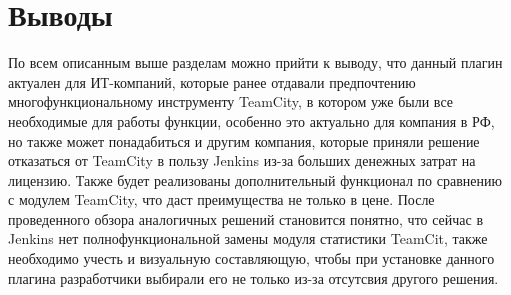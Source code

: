 \section{Выводы} \label{ch1:sec7}

По всем описанным выше разделам можно прийти к выводу, что данный плагин актуален для ИТ-компаний, которые ранее отдавали предпочтению многофункциональному инструменту TeamCity, в котором уже были все необходимые для работы функции, особенно это актуально для компания в РФ, но также может понадабиться и другим компания, которые приняли решение отказаться от TeamCity в пользу Jenkins из-за больших денежных затрат на лицензию. Также будет реализованы дополнительный функционал по сравнению с модулем TeamCity, что даст преимущества не только в цене. После проведенного обзора аналогичных решений становится понятно, что сейчас в Jenkins нет полнофункциональной замены модуля статистики TeamCit, также необходимо учесть и визуальную составляющую, чтобы при установке данного плагина разработчики выбирали его не только из-за отсутсвия другого решения.













%
%

%
%






